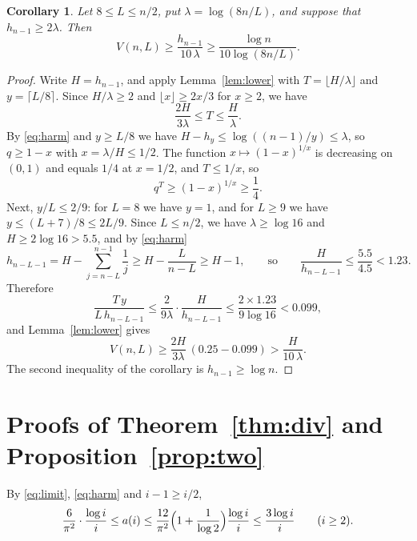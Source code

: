 \documentclass[11pt]{amsart}
\newtheorem{corollary}[theorem]{Corollary}
\theoremstyle{remark}
\numberwithin{equation}{section}
\begin{document}
\begin{corollary}\label{cor:many}
Let $8\le L\le n/2$, put $\lambda=\log(8n/L)$, and suppose that $h_{n-1}\ge2\lambda$. Then
\[
V(n,L)\ge\frac{h_{n-1}}{10\,\lambda}\ge\frac{\log n}{10\log(8n/L)}.
\]
\end{corollary}

\begin{proof}
Write $H=h_{n-1}$, and apply Lemma~\ref{lem:lower} with $T=\lfloor H/\lambda\rfloor$ and $y=\lceil L/8\rceil$. Since
$H/\lambda\ge2$ and $\lfloor x\rfloor\ge2x/3$ for $x\ge2$, we have
\[
\frac{2H}{3\lambda}\le T\le\frac{H}{\lambda}.
\]
By \eqref{eq:harm} and $y\ge L/8$ we have $H-h_y\le\log((n-1)/y)\le\lambda$, so $q\ge1-x$ with $x=\lambda/H\le1/2$. The
function $x\mapsto(1-x)^{1/x}$ is decreasing on $(0,1)$ and equals $1/4$ at $x=1/2$, and $T\le1/x$, so
\[
q^{T}\ge(1-x)^{1/x}\ge\frac14 .
\]
Next, $y/L\le2/9$: for $L=8$ we have $y=1$, and for $L\ge9$ we have $y\le(L+7)/8\le2L/9$. Since $L\le n/2$, we have
$\lambda\ge\log16$ and $H\ge2\log16>5.5$, and by \eqref{eq:harm}
\[
h_{n-L-1}=H-\sum_{j=n-L}^{n-1}\frac1j\ge H-\frac{L}{n-L}\ge H-1,\qquad\text{so}\qquad\frac{H}{h_{n-L-1}}\le\frac{5.5}{4.5}<1.23 .
\]
Therefore
\[
\frac{T\,y}{L\,h_{n-L-1}}\le\frac{2}{9\lambda}\cdot\frac{H}{h_{n-L-1}}\le\frac{2\times1.23}{9\log16}<0.099 ,
\]
and Lemma~\ref{lem:lower} gives
\[
V(n,L)\ge\frac{2H}{3\lambda}\,(0.25-0.099)>\frac{H}{10\,\lambda}.
\]
The second inequality of the corollary is $h_{n-1}\ge\log n$.
\end{proof}

\section{Proofs of Theorem~\ref{thm:div} and Proposition~\ref{prop:two}}\label{sec:proofs}

By \eqref{eq:limit}, \eqref{eq:harm} and $i-1\ge i/2$,
\begin{equation}\label{eq:abound}
\frac{6}{\pi^2}\cdot\frac{\log i}{i}\le a(i)\le\frac{12}{\pi^2}\Bigl(1+\frac{1}{\log2}\Bigr)\frac{\log i}{i}\le\frac{3\log i}{i}
\qquad(i\ge2).
\end{equation}
\end{document}
